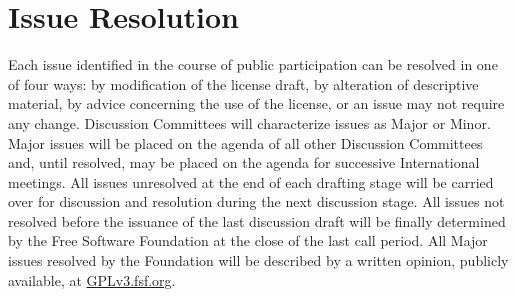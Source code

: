 \section{Issue Resolution}

Each issue identified in the course of public participation can be resolved
in one of four ways: by modification of the license draft, by alteration of
descriptive material, by advice concerning the use of the license, or an
issue may not require any change. Discussion Committees will characterize
issues as Major or Minor. Major issues will be placed on the agenda of
all other Discussion Committees and, until resolved, may be placed on the
agenda for successive International meetings. All issues unresolved at the
end of each drafting stage will be carried over for discussion and
resolution during the next discussion stage. All issues not resolved before
the issuance of the last discussion draft will be finally determined by the
Free Software Foundation at the close of the last call period. All Major
issues resolved by the Foundation will be described by a written opinion,
publicly available, at \url{GPLv3.fsf.org}.
